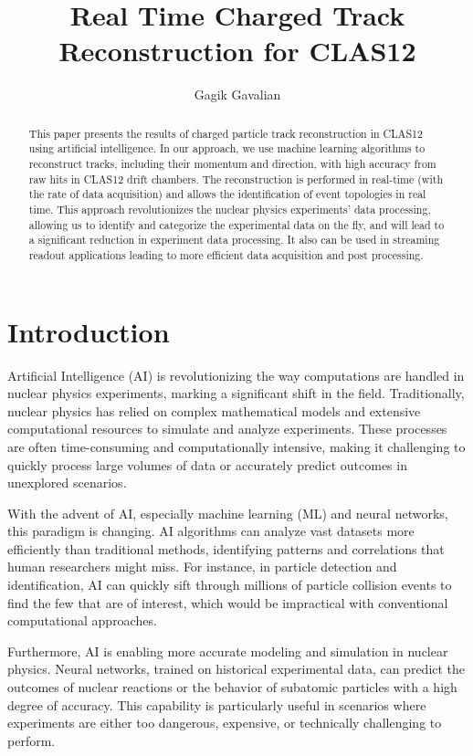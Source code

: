 \documentclass[preprint,12pt]{elsarticle}
\title{Real Time Charged Track Reconstruction for CLAS12}
\author[1]{Gagik Gavalian}
\begin{document}
\begin{abstract}
This paper presents the results of charged particle track reconstruction in CLAS12 using artificial intelligence. In our approach, we 
use machine learning algorithms to reconstruct tracks, including their momentum and direction, with high accuracy from raw hits in CLAS12
drift chambers. The reconstruction is performed in real-time (with the rate of data acquisition) and allows the identification of event topologies in real time.
This approach revolutionizes the nuclear physics experiments' data processing, allowing us to identify and categorize the experimental data on the fly, and will lead to a significant reduction in experiment data processing. It also can be used in streaming readout applications leading to more efficient data acquisition and post processing.

\end{abstract}
\maketitle


\section{Introduction}
\indent
Artificial Intelligence (AI) is revolutionizing the way computations are handled in nuclear physics experiments, marking a significant shift in the field. Traditionally, nuclear physics has relied on complex mathematical models and extensive computational resources to simulate and analyze experiments. These processes are often time-consuming and computationally intensive, making it challenging to quickly process large volumes of data or accurately predict outcomes in unexplored scenarios.

With the advent of AI, especially machine learning (ML) and neural networks, this paradigm is changing. AI algorithms can analyze vast datasets more efficiently than traditional methods, identifying patterns and correlations that human researchers might miss. For instance, in particle detection and identification, AI can quickly sift through millions of particle collision events to find the few that are of interest, which would be impractical with conventional computational approaches.

Furthermore, AI is enabling more accurate modeling and simulation in nuclear physics. Neural networks, trained on historical experimental data, can predict the outcomes of nuclear reactions or the behavior of subatomic particles with a high degree of accuracy. This capability is particularly useful in scenarios where experiments are either too dangerous, expensive, or technically challenging to perform.
\end{document}
